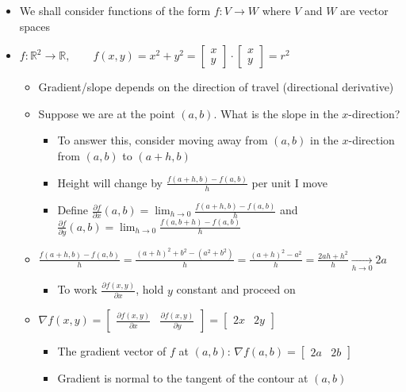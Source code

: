 \documentclass{article}
\begin{document}
\begin{itemize}
\begin{itemize}
\begin{itemize}
        \end{itemize}
    \end{itemize}
    \item We shall consider functions of the form $f: V \rightarrow W$ where $V$ and $W$ are vector spaces
    \item $f: \mathbb{R}^2 \rightarrow \mathbb{R}, \qquad f(x,y)=x^2+y^2 = \left[ \begin{array}{c}
        x \\
        y
    \end{array}\right] \cdot \left[ \begin{array}{c}
        x \\
        y
    \end{array}\right] = r^2$
    \begin{itemize}
        \item Gradient/slope depends on the direction of travel (directional derivative)
        \item Suppose we are at the point $(a,b)$. What is the slope in the $x$-direction?
        \begin{itemize}
            \item To answer this, consider moving away from $(a,b)$ in the $x$-direction from $(a,b)$ to $(a+h,b)$
            \item Height will change by $\frac{f(a+h,b)-f(a,b)}{h}$ per unit I move
            \item Define $\frac{\partial f}{\partial x}(a,b) = \lim_{h \rightarrow 0} \frac{f(a+h,b)-f(a,b)}{h}$ and $\frac{\partial f}{\partial y}(a,b) = \lim_{h \rightarrow 0} \frac{f(a,b+h)-f(a,b)}{h}$
        \end{itemize}
        \item $\frac{f(a+h,b)-f(a,b)}{h} = \frac{(a+h)^2 + b^2 - (a^2 + b^2)}{h} = \frac{(a+h)^2 - a^2}{h}  = \frac{2ah + h^2}{h} \underset{h \rightarrow 0}{\rightarrow} 2a$
        \begin{itemize}
            \item To work $\frac{\partial f(x,y)}{\partial x}$, hold $y$ constant and proceed on
        \end{itemize}
        \item $\nabla f(x,y) = \left[ \begin{array}{cc}
            \frac{\partial f(x,y)}{\partial x} & \frac{\partial f(x,y)}{\partial y}
        \end{array} \right] = \left[ \begin{array}{cc}
            2x & 2y
        \end{array} \right]$
        \begin{itemize}
            \item The gradient vector of $f$ at $(a,b)$: $\nabla f(a,b) = \left[ \begin{array}{cc}
                2a & 2b
            \end{array} \right]$
            \item Gradient is normal to the tangent of the contour at $(a,b)$
        \end{itemize}
    \end{itemize}
    

\end{itemize}
\end{document}
